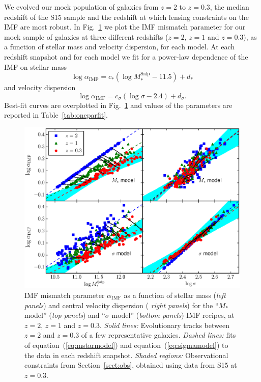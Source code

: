 \documentclass[usenatbib]{mnras}
\def\msalp{M_*^{\mathrm{Salp}}}
\def\aimf{\alpha_{\mathrm{IMF}}}
\def\Sref#1{Section~\ref{#1}\xspace}
\def\Fref#1{Fig.~\ref{#1}\xspace}
\def\Tref#1{Table~\ref{#1}\xspace}
\def\Eref#1{equation~(\ref{#1})\xspace}
\begin{document}
We evolved our mock population of galaxies from $z=2$ to $z=0.3$, the
median redshift of the S15 sample and the redshift at which lensing constraints on the IMF are most robust. In \Fref{fig:snap} we
plot the IMF mismatch parameter for our mock sample of galaxies at
three different redshifts ($z=2$, $z=1$ and $z=0.3$), as a function of
stellar mass and velocity dispersion, for each model.
At each redshift snapshot and for each model we fit for a power-law dependence of the IMF on stellar mass 
%
\begin{equation}\label{eq:mstarmodel}
\log{\aimf} = c_*(\log{\msalp} - 11.5) + d_*
\end{equation}
%
and velocity dispersion
%
\begin{equation}\label{eq:sigmamodel}
\log{\aimf} = c_\sigma(\log{\sigma} - 2.4) + d_\sigma.
\end{equation}
%
Best-fit curves are overplotted in \Fref{fig:snap} and values of the parameters are reported in \Tref{tab:oneparfit}.
%
\begin{figure}
 \includegraphics[width=\textwidth]{snapshots.eps}
 \caption{ IMF mismatch parameter $\aimf$ as a function of stellar
   mass ({\em left panels}) and central velocity dispersion ({\em
     right panels}) for the ``$M_*$ model'' ({\em top panels}) and
   ``$\sigma$ model'' ({\em bottom panels}) IMF recipes, at $z=2$,
   $z=1$ and $z=0.3$.  {\em Solid lines:} Evolutionary tracks between
   $z=2$ and $z=0.3$ of a few representative galaxies.  {\em Dashed
     lines:} fits of \Eref{eq:mstarmodel} and \Eref{eq:sigmamodel} to the data in each redshift snapshot. {\em
     Shaded regions:} Observational constraints from \Sref{sect:obs},
   obtained using data from S15 at $z=0.3$.   }
 \label{fig:snap}
\end{figure}
\end{document}
